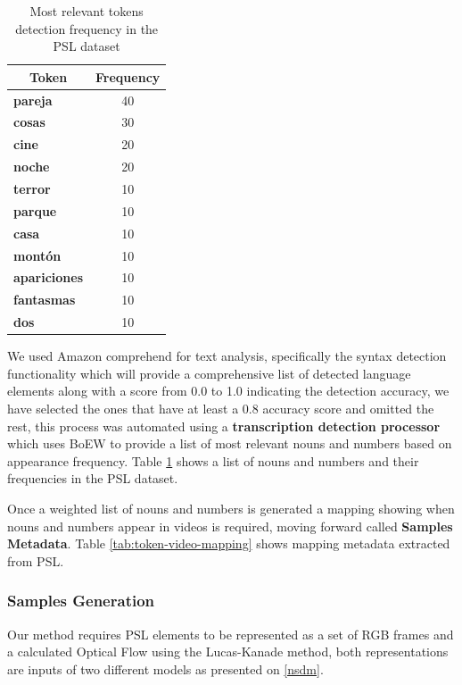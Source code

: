 \documentclass[twocolumn,conference]{article}
\begin{document}
\begin{table}[!htb]
\captionsetup{size=footnotesize}
\begin{tabular}{ p{16em} c}
\toprule
\multicolumn{1}{c}{\textbf{Token}} & 
	\multicolumn{1}{c}{\textbf{Frequency}}\\
\midrule
\textbf{pareja}&	40\\
\textbf{cosas}&	30\\
\textbf{cine}&	20\\
\textbf{noche}&	20\\
\textbf{terror}&	10\\
\textbf{parque}&	10\\
\textbf{casa}&	10\\
\textbf{montón}&	10\\
\textbf{apariciones}&	10\\
\textbf{fantasmas}&	10\\
\textbf{dos}&	10\\
\bottomrule
\end{tabular}
\caption{Most relevant tokens detection frequency in the PSL dataset} \label{tab:token-freq}
\end{table}

We used Amazon comprehend for text analysis, specifically the syntax detection functionality which will provide a comprehensive list of detected language elements along with a score from 0.0 to 1.0 indicating the detection accuracy, we have selected the ones that have at least a 0.8 accuracy score and omitted the rest, this process was automated using a \textbf{transcription detection processor} which uses BoEW to provide a list of most relevant nouns and numbers based on appearance frequency. Table \ref{tab:token-freq} shows a list of nouns and numbers and their frequencies in the PSL dataset.

Once a weighted list of nouns and numbers is generated a mapping showing when nouns and numbers appear in videos is required, moving forward called \textbf{Samples Metadata}. Table \ref{tab:token-video-mapping} shows mapping metadata extracted from PSL.

\subsubsection{Samples Generation}\label{samples-generation} 
Our method requires PSL elements to be represented as a set of RGB frames and a calculated Optical Flow using the Lucas-Kanade method, both representations are inputs of two different models as presented on \ref{nsdm}.
\end{document}

